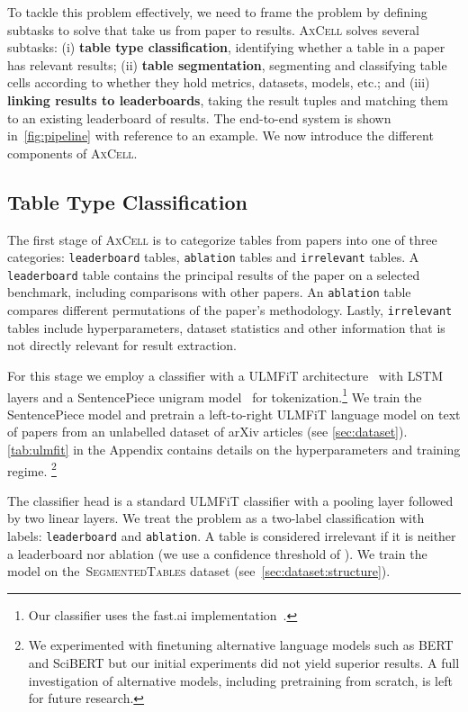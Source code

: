 \documentclass[11pt,a4paper]{article}
\newcommand{\model}{\textsc{AxCell}}
\newcommand{\finegrained}{\textsc{SegmentedTables}}
\begin{document}
To tackle this problem effectively, we need to frame the problem by defining subtasks to solve that take us from paper to results. \model{} solves several subtasks: (i) \textbf{table type classification}, identifying whether a table in a paper has relevant results; (ii) \textbf{table segmentation}, segmenting and classifying table cells according to whether they hold metrics, datasets, models, etc.; and (iii) \textbf{linking results to leaderboards}, taking the result tuples and matching them to an existing leaderboard of results. The end-to-end system is shown in~\cref{fig:pipeline} with reference to an example. We now introduce the different components of \model{}.

\subsection{Table Type Classification}
The first stage of \model{} is to categorize tables from papers into one of three categories: \texttt{leaderboard} tables, \texttt{ablation} tables and \texttt{irrelevant} tables. A \texttt{leaderboard} table contains the principal results of the paper on a selected benchmark, including comparisons with other papers. An \texttt{ablation} table compares different permutations of the paper's methodology. Lastly, \texttt{irrelevant} tables include hyperparameters, dataset statistics and other information that is not directly relevant for result extraction.

For this stage we employ a classifier with a ULMFiT architecture~\citep{ulmfit} with LSTM layers and a SentencePiece unigram model~\citep{sentencepiece} for tokenization.\footnote{Our classifier uses the fast.ai implementation~\citep{fastai}.} We train the SentencePiece model and pretrain a left-to-right ULMFiT language model on text of papers from an unlabelled dataset of arXiv articles (see \cref{sec:dataset}). \cref{tab:ulmfit} in the Appendix contains details on the hyperparameters and training regime. \footnote{We experimented with finetuning alternative language models such as BERT and SciBERT but our initial experiments did not yield superior results. A full investigation of alternative models, including pretraining from scratch, is left for future research.}


The classifier head is a standard ULMFiT classifier with a pooling layer followed by two linear layers. We treat the problem as a two-label classification with labels: \texttt{leaderboard} and \texttt{ablation}. A table is considered irrelevant if it is neither a leaderboard nor ablation (we use a confidence threshold of ). We train the model on the~\finegrained{} dataset (see~\cref{sec:dataset:structure}).
\end{document}
